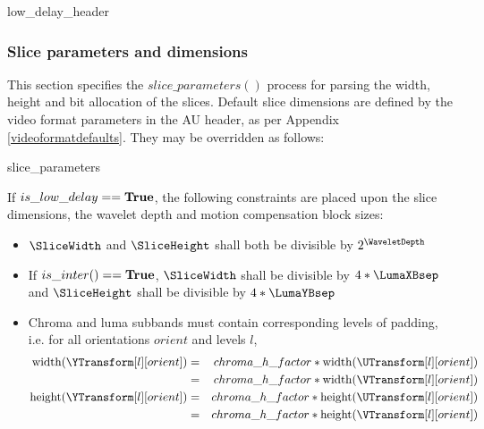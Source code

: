 \begin{pseudo}{low\_delay\_header}{}
\end{pseudo}

\subsubsection{Slice parameters and dimensions}
\label{sliceparams}

This section specifies the $slice\_parameters()$ process for parsing the width, height and bit allocation of 
the slices. Default slice dimensions are defined by the video format parameters in the AU header, as per Appendix 
\ref{videoformatdefaults}. They may be overridden as follows:

\begin{pseudo}{slice\_parameters}{}
\bsEND
{}
\bsEND
\end{pseudo}

If $is\_low\_delay==\text{\bf{True}}$, the following constraints are placed upon the slice dimensions, the wavelet depth
 and motion compensation block sizes:

\begin{itemize}
\item $\SliceWidth$ and $\SliceHeight$ shall both be divisible by $2^\WaveletDepth$
\item If $is\_inter()==\text{\bf{True}}$, $\SliceWidth$ shall be divisible by $4*\LumaXBsep$ and $\SliceHeight$ shall be divisible by $4*\LumaYBsep$
\item Chroma and luma subbands must contain corresponding levels of padding, i.e. for all orientations $orient$ and levels $l$,
\begin{eqnarray*}
\width(\YTransform[l][orient]) & = & chroma\_h\_factor*\width(\UTransform[l][orient]) \\
& = & chroma\_h\_factor*\width(\VTransform[l][orient]) \\
\height(\YTransform[l][orient]) & = & chroma\_h\_factor*\height(\UTransform[l][orient]) \\
& = & chroma\_h\_factor*\height(\VTransform[l][orient]) \\
\end{eqnarray*}
\end{itemize}

